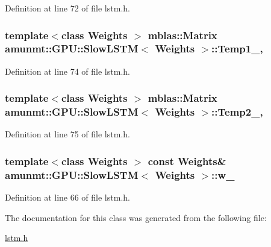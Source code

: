 Definition at line 72 of file lstm.\+h.

\subsubsection[{\texorpdfstring{Temp1\+\_\+}{Temp1_}}]{\setlength{\rightskip}{0pt plus 5cm}template$<$class Weights $>$ {\bf mblas\+::\+Matrix} {\bf amunmt\+::\+G\+P\+U\+::\+Slow\+L\+S\+TM}$<$ {\bf Weights} $>$\+::Temp1\+\_\+\hspace{0.3cm}{\ttfamily [mutable]}, {\ttfamily [private]}}\hypertarget{classamunmt_1_1GPU_1_1SlowLSTM_a7f4c6738987f74b5e9149f1d7fe0252d}{}\label{classamunmt_1_1GPU_1_1SlowLSTM_a7f4c6738987f74b5e9149f1d7fe0252d}


Definition at line 74 of file lstm.\+h.

\subsubsection[{\texorpdfstring{Temp2\+\_\+}{Temp2_}}]{\setlength{\rightskip}{0pt plus 5cm}template$<$class Weights $>$ {\bf mblas\+::\+Matrix} {\bf amunmt\+::\+G\+P\+U\+::\+Slow\+L\+S\+TM}$<$ {\bf Weights} $>$\+::Temp2\+\_\+\hspace{0.3cm}{\ttfamily [mutable]}, {\ttfamily [private]}}\hypertarget{classamunmt_1_1GPU_1_1SlowLSTM_a3a29c35d0a5a19dcf9111445f1708d11}{}\label{classamunmt_1_1GPU_1_1SlowLSTM_a3a29c35d0a5a19dcf9111445f1708d11}


Definition at line 75 of file lstm.\+h.

\subsubsection[{\texorpdfstring{w\+\_\+}{w_}}]{\setlength{\rightskip}{0pt plus 5cm}template$<$class Weights $>$ const {\bf Weights}\& {\bf amunmt\+::\+G\+P\+U\+::\+Slow\+L\+S\+TM}$<$ {\bf Weights} $>$\+::w\+\_\+\hspace{0.3cm}{\ttfamily [private]}}\hypertarget{classamunmt_1_1GPU_1_1SlowLSTM_a200f343f4c27af61742a106f78f6d564}{}\label{classamunmt_1_1GPU_1_1SlowLSTM_a200f343f4c27af61742a106f78f6d564}


Definition at line 66 of file lstm.\+h.



The documentation for this class was generated from the following file\+:\begin{DoxyCompactItemize}
\item 
\hyperlink{lstm_8h}{lstm.\+h}\end{DoxyCompactItemize}
